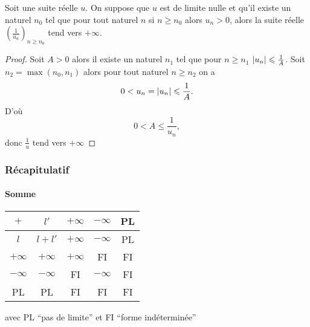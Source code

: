 \begin{prop}
  Soit une suite réelle \(u\). On suppose que \(u\) est de limite nulle et qu'il existe un naturel \(n_0\) tel que pour tout naturel \(n\) si \(n \geqslant n_0\) alors \(u_n > 0\), alors la suite réelle \(\left(\frac{1}{u_n}\right)_{n \geqslant n_0}\) tend vers \(+\infty\).
\end{prop}
\begin{proof}
  Soit \(A>0\) alors il existe un naturel \(n_1\) tel que pour \(n \geqslant n_1\) \(\left\lvert u_n\right\rvert \leqslant \frac{1}{A}\). Soit \(n_2=\max(n_0,n_1)\) alors pour tout naturel \(n \geqslant n_2\) on a
  \begin{equation}
    0 < u_n=\left\lvert u_n\right\rvert \leqslant \frac{1}{A}.
  \end{equation}
  D'où
  \begin{equation}
    0 < A \leqslant \frac{1}{u_n},
  \end{equation}
  donc \(\frac{1}{u}\) tend vers \(+\infty\)
\end{proof}

\subsubsection{Récapitulatif}

\paragraph{Somme}

\begin{center}
  \begin{tabular}{|c|c|c|c|c|}\hline
    \(+\) & \(l'\) & \(+\infty\) & \(-\infty\) & PL \\ \hline
    \(l\) & \(l+l'\) & \(+\infty\) & \(-\infty\) & PL \\ \hline
    \(+\infty\) & \(+\infty\) & \(+\infty\) & FI & FI \\ \hline
    \(-\infty\) & \(-\infty\) & FI & \(-\infty\) & FI \\ \hline
    PL & PL & FI & FI & FI \\ \hline
  \end{tabular}
\end{center}

avec PL ``pas de limite'' et FI ``forme indéterminée''

